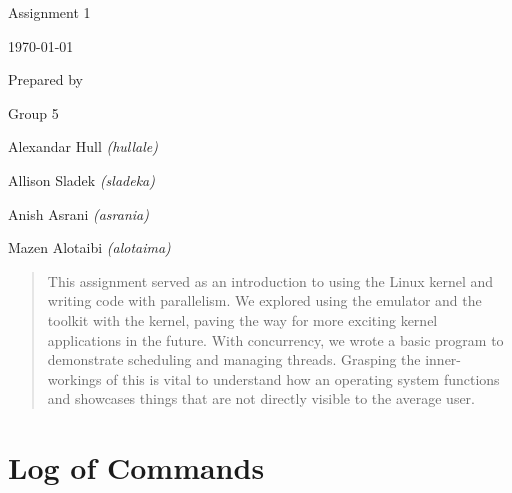 \documentclass[onecolumn, draftclsnofoot,10pt, compsoc]{IEEEtran}
\def \CapstoneTeamNumber{		5}
\def \GroupMemberOne{			Alexandar Hull \textit{(hullale)}}
\def \GroupMemberTwo{			Allison Sladek \textit{(sladeka)}}
\def \GroupMemberThree{			Anish Asrani \textit{(asrania)}}
\def \GroupMemberFour{			Mazen Alotaibi \textit{(alotaima)}}
\def \DocType{ Assignment 1}
\newcommand{\NameSigPair}[1]{\par
\makebox[2.75in][r]{#1} \hfil 	\makebox[3.25in]{\makebox[2.25in]{\hrulefill} \hfill		\makebox[.75in]{\hrulefill}}
\par\vspace{-12pt} \textit{\tiny\noindent
\makebox[2.75in]{} \hfil		\makebox[3.25in]{\makebox[2.25in][r]{Signature} \hfill	\makebox[.75in][r]{Date}}}}
\renewcommand{\NameSigPair}[1]{#1}
\begin{document}
\begin{titlepage}
    \begin{singlespace}
        \hfill 
        \par\vspace{.2in}
        \centering
        \scshape{
            \huge \DocType \par
            {\large\today}\par
            \vspace{.5in}
            \vfill
            \vspace{5pt}
            {\large Prepared by }\par
            Group\CapstoneTeamNumber\par
            \vspace{5pt}
            {\Large
                \NameSigPair{\GroupMemberOne}\par
                \NameSigPair{\GroupMemberTwo}\par
                \NameSigPair{\GroupMemberThree}\par
                \NameSigPair{\GroupMemberFour}\par
            }
            \vspace{20pt}
        }
        \begin{abstract}
        This assignment served as an introduction to using the Linux kernel and writing code with parallelism. We explored using the emulator and the toolkit with the kernel, paving the way for more exciting kernel applications in the future.
        With concurrency, we wrote a basic program to demonstrate scheduling and managing threads. Grasping the inner-workings of this is vital to understand how an operating system functions and showcases things that are not directly visible to the average user. 
        
        
        \end{abstract}     
    \end{singlespace}
\end{titlepage}
\newpage
{}
\tableofcontents
\clearpage

\section{Log of Commands}
\end{document}
